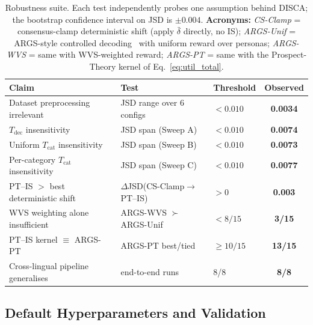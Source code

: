 \documentclass{article}
\begin{document}
\begin{table}[H]\centering\small
\caption{Robustness suite. Each test independently probes one assumption
behind DISCA; the bootstrap confidence interval on JSD is $\pm 0.004$. \textbf{Acronyms:} \textit{CS-Clamp} = consensus-clamp deterministic shift (apply $\bar\delta$ directly, no IS); \textit{ARGS-Unif} = ARGS-style controlled decoding~\citep{khanov2024args} with uniform reward over personas; \textit{ARGS-WVS} = same with WVS-weighted reward; \textit{ARGS-PT} = same with the Prospect-Theory kernel of Eq.~\ref{eq:util_total}.}
\label{tab:robustness_summary}
\setlength{\tabcolsep}{4pt}
\begin{tabular}{lllc}\toprule
Claim & Test & Threshold & Observed \\\midrule
Dataset preprocessing irrelevant & JSD range over 6 configs & $<\!0.010$ & \textbf{0.0034} \\
$T_\text{dec}$ insensitivity & JSD span (Sweep A) & $<\!0.010$ & \textbf{0.0074} \\
Uniform $T_\text{cat}$ insensitivity & JSD span (Sweep B) & $<\!0.010$ & \textbf{0.0073} \\
Per-category $T_\text{cat}$ insensitivity & JSD span (Sweep C) & $<\!0.010$ & \textbf{0.0077} \\
PT--IS $>$ best deterministic shift & $\Delta$JSD(CS-Clamp$\to$PT--IS) & $>\!0$ & \textbf{0.003} \\
WVS weighting alone insufficient & ARGS-WVS $\succ$ ARGS-Unif & $<\!8/15$ & \textbf{3/15} \\
PT--IS kernel $\equiv$ \textsc{ARGS-PT} & ARGS-PT best/tied & $\ge 10/15$ & \textbf{13/15} \\
Cross-lingual pipeline generalises & end-to-end runs & 8/8 & \textbf{8/8} \\\bottomrule
\end{tabular}
\end{table}

\subsection{Default Hyperparameters and Validation}
\end{document}
